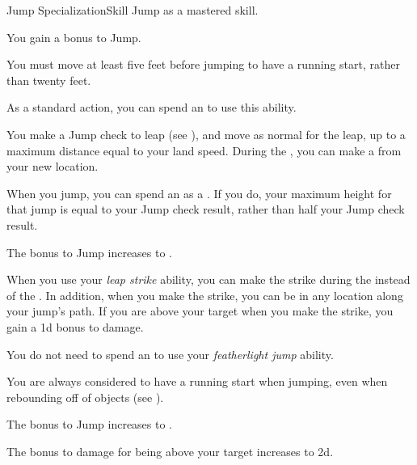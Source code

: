     \begin{feat}{Jump Specialization}{Skill}
        \featpre Jump as a mastered skill.
        \featben

         You gain a  bonus to Jump.

         You must move at least five feet before jumping to have a running start, rather than twenty feet.

         As a standard action, you can spend an  to use this ability.
        \begin{ability}
            \begin{spelleffects}
                \spelleffect You make a Jump check to leap (see ), and move as normal for the leap, up to a maximum distance equal to your land speed.
                During the , you can make a  from your new location.
            \end{spelleffects}
        \end{ability}

         When you jump, you can spend an  as a .
        If you do, your maximum height for that jump is equal to your Jump check result, rather than half your Jump check result.

         The bonus to Jump increases to .

         When you use your \textit{leap strike} ability, you can make the strike during the  instead of the .
        In addition, when you make the strike, you can be in any location along your jump's path.
        If you are above your target when you make the strike, you gain a \plus1d bonus to damage.

         You do not need to spend an  to use your \textit{featherlight jump} ability.

         You are always considered to have a running start when jumping, even when rebounding off of objects (see ).

         The bonus to Jump increases to .

         The bonus to damage for being above your target increases to \plus2d.
    \end{feat}

